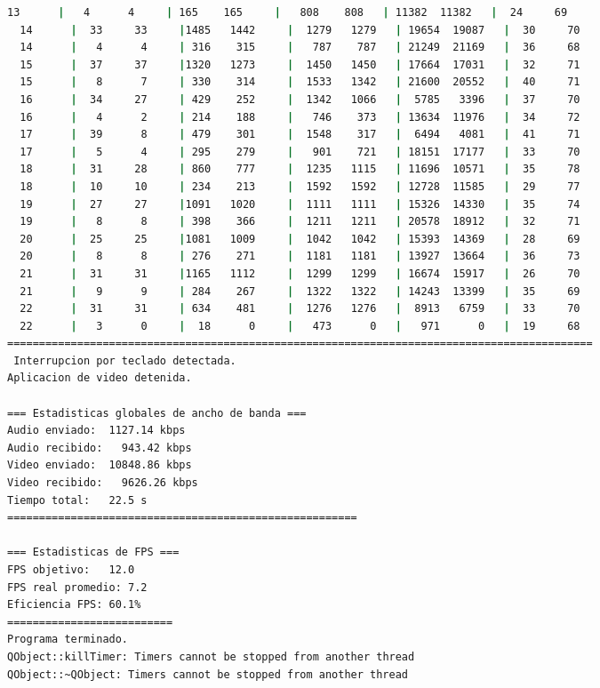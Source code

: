 \begin{adjustbox}{max width=\textwidth}
\begin{lstlisting}[language=bash,basicstyle=\ttfamily\scriptsize]
  13      |   4      4     | 165    165     |   808    808   | 11382  11382   |  24     69
  14      |  33     33     |1485   1442     |  1279   1279   | 19654  19087   |  30     70
  14      |   4      4     | 316    315     |   787    787   | 21249  21169   |  36     68
  15      |  37     37     |1320   1273     |  1450   1450   | 17664  17031   |  32     71
  15      |   8      7     | 330    314     |  1533   1342   | 21600  20552   |  40     71
  16      |  34     27     | 429    252     |  1342   1066   |  5785   3396   |  37     70
  16      |   4      2     | 214    188     |   746    373   | 13634  11976   |  34     72
  17      |  39      8     | 479    301     |  1548    317   |  6494   4081   |  41     71
  17      |   5      4     | 295    279     |   901    721   | 18151  17177   |  33     70
  18      |  31     28     | 860    777     |  1235   1115   | 11696  10571   |  35     78
  18      |  10     10     | 234    213     |  1592   1592   | 12728  11585   |  29     77
  19      |  27     27     |1091   1020     |  1111   1111   | 15326  14330   |  35     74
  19      |   8      8     | 398    366     |  1211   1211   | 20578  18912   |  32     71
  20      |  25     25     |1081   1009     |  1042   1042   | 15393  14369   |  28     69
  20      |   8      8     | 276    271     |  1181   1181   | 13927  13664   |  36     73
  21      |  31     31     |1165   1112     |  1299   1299   | 16674  15917   |  26     70
  21      |   9      9     | 284    267     |  1322   1322   | 14243  13399   |  35     69
  22      |  31     31     | 634    481     |  1276   1276   |  8913   6759   |  33     70
  22      |   3      0     |  18      0     |   473      0   |   971      0   |  19     68
============================================================================================
 Interrupcion por teclado detectada.
Aplicacion de video detenida.

=== Estadisticas globales de ancho de banda ===
Audio enviado:	1127.14 kbps
Audio recibido:   943.42 kbps
Video enviado:	10848.86 kbps
Video recibido:   9626.26 kbps
Tiempo total: 	22.5 s
=======================================================

=== Estadisticas de FPS ===
FPS objetivo: 	12.0
FPS real promedio: 7.2
Eficiencia FPS:	60.1%
==========================
Programa terminado.
QObject::killTimer: Timers cannot be stopped from another thread
QObject::~QObject: Timers cannot be stopped from another thread
\end{lstlisting}
\end{adjustbox}
\vspace{\baselineskip}

